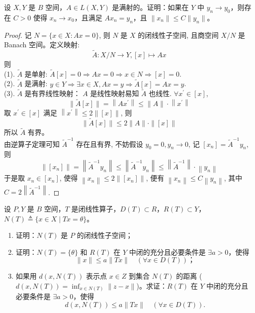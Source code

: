 \documentclass[lang=cn,newtx,10pt,scheme=chinese,thmcnt=chapter]{elegantbook}
\begin{document}
\begin{problem}
设 ${X}, {Y}$ 是 $B$ 空间，$A \in {L}({X},{ Y})$ 是满射的。证明：如果在 ${Y}$ 中 $y_n \rightarrow y_0$，则存在 $C > 0$ 使得 $x_n \rightarrow x_0$，且满足 $A x_n = y_n$，且 $\|x_n\| \leqslant C \|y_n\|$。
\end{problem}
\begin{proof}
记 $N=\{x \in X: A x=0\}$, 则 $N$ 是 $X$ 的闭线性子空间, 且商空间 $X / N$ 是 Banach 空间。定义映射:
\begin{equation*}
\tilde{A}: X / N \rightarrow Y,[x] \mapsto A x
\end{equation*}
则\\
(1). $\tilde{A}$ 是单射: $\tilde{A}[x]=0 \Rightarrow A x=0 \Rightarrow x \in N \Rightarrow[x]=0$.\\
(2). $\tilde{A}$ 是满射: $y \in Y \Rightarrow \exists x \in X, A x=y \Rightarrow \tilde{A}[x]=A x=y$.\\
(3). $\tilde{A}$ 是有界线性映射： $A$ 是线性映射易知 $\tilde{A}$ 也线性. $\forall x^{\prime} \in[x]$,
\begin{equation*}
\|\tilde{A}[x]\|=\left\|A x^{\prime}\right\| \leqslant\|A\| \cdot\left\|x^{\prime}\right\|
\end{equation*}
取 $x^{\prime} \in[x]$ 满足 $\left\|x^{\prime}\right\| \leqslant 2\|[x]\|$, 则
\begin{equation*}
\|\tilde{A}[x]\| \leqslant 2\|A\| \cdot\|[x]\|
\end{equation*}
所以 $\tilde{A}$ 有界。\\
由逆算子定理可知 $\tilde{A}^{-1}$ 存在且有界, 不妨假设 $y_0=0, y_n \rightarrow 0$, 记 $\left[x_n\right]=\tilde{A}^{-1} y_n$, 则
\begin{equation*}
\left\|\left[x_n\right]\right\|=\left\|\tilde{A}^{-1} y_n\right\| \leqslant\left\|\tilde{A}^{-1} y_n\right\| \leqslant\left\|\tilde{A}^{-1}\right\| \cdot\left\|y_n\right\|
\end{equation*}
于是取 $x_n \in\left[x_n\right]$, 使得 $\left\|x_n\right\| \leqslant 2\left\|\left[x_n\right]\right\|$, 便有 $\left\|x_n\right\| \leqslant C\left\|y_n\right\|$, 其中 $C=2\left\|\tilde{A}^{-1}\right\|$.
\end{proof}
\begin{problem}
设 $P, Y$ 是 $B$ 空间，$T$ 是闭线性算子，$D(T) \subset R$，$R(T) \subset Y$，$N(T) \triangleq \{x \in X \mid T x = \theta\}$。
\begin{enumerate}
    \item 证明：$N(T)$ 是 $P$ 的闭线性子空间；
    \item 证明：$N(T) = \{\theta\}$ 和 $R(T)$ 在 $Y$ 中闭的充分且必要条件是 $\exists a > 0$，使得
    \[
    \|x\| \leqslant a\|T x\| \quad (\forall x \in D(T))；
    \]
    \item 如果用 $d(x, N(T))$ 表示点 $x \in Z$ 到集合 $N(T)$ 的距离 ($d(x, N(T)) = \inf_{x \in N(T)} \|z-x\|$)。求证：$R(T)$ 在 $Y$ 中闭的充分且必要条件是 $\exists a > 0$，使得
    \[
    d(x, N(T)) \leqslant a\|T x\| \quad (\forall x \in D(T)) .
    \]
\end{enumerate}
\end{problem}
\end{document}
